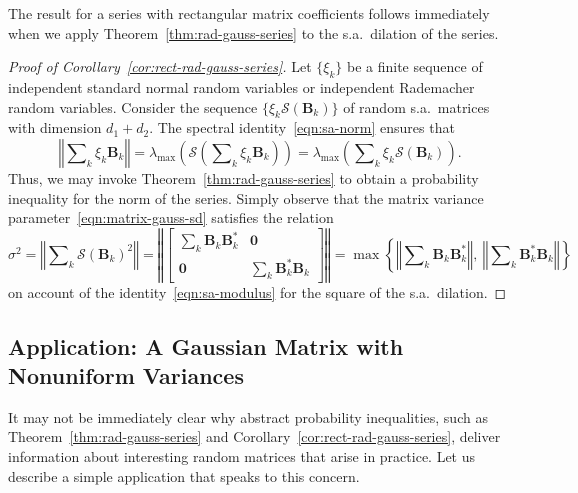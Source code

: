 \documentclass[11pt,letterpaper,twoside,reqno,draft]{amsart}
\theoremstyle{remark}
\numberwithin{equation}{section}
\numberwithin{thm}{section}
\begin{document}
The result for a series with rectangular matrix coefficients follows immediately when we apply Theorem~\ref{thm:rad-gauss-series} to the s.a.~dilation of the series.

\begin{proof}[Proof of Corollary~\ref{cor:rect-rad-gauss-series}]
Let $\{\xi_k\}$ be a finite sequence of independent standard normal random variables or independent Rademacher random variables.  Consider the sequence $\{ \xi_k {\mathscr{{S}}}( {\bm{{B}}}_k ) \}$ of random s.a.~matrices with dimension $d_1 + d_2$.
The spectral identity~\eqref{eqn:sa-norm} ensures that
$$
{\left\Vert {{ \sum\nolimits_k \xi_k {\bm{{B}}}_k }} \right\Vert}
	= \lambda_{\max}\left( {\mathscr{{S}}}\left( \sum\nolimits_k \xi_k {\bm{{B}}}_k \right) \right)
	= \lambda_{\max}\left(\sum\nolimits_k \xi_k {\mathscr{{S}}}({\bm{{B}}}_k)\right).
$$
Thus, we may invoke Theorem~\ref{thm:rad-gauss-series} to obtain a probability inequality for the norm of the series.
Simply observe that the matrix variance parameter~\eqref{eqn:matrix-gauss-sd} satisfies the relation
$$
\sigma^2 = {\left\Vert {{ \sum\nolimits_k {\mathscr{{S}}}({\bm{{B}}}_k)^2 }} \right\Vert}
	= {\left\Vert {{ \begin{bmatrix} \sum\nolimits_k {\bm{{B}}}_k {\bm{{B}}}_k^{*} & {\bm{{0}}} \\
	 {\bm{{0}}} & \sum\nolimits_k {\bm{{B}}}_k^{*}{\bm{{B}}}_k \end{bmatrix} }} \right\Vert}
	= \max\left\{
	{\left\Vert {{ \sum\nolimits_k {\bm{{B}}}_k {\bm{{B}}}_k^{*}}} \right\Vert}, \
	{\left\Vert {{ \sum\nolimits_k {\bm{{B}}}_k^{*} {\bm{{B}}}_k}} \right\Vert}
	\right\}
$$
on account of the identity~\eqref{eqn:sa-modulus} for the square of the s.a.~dilation.
\end{proof}

\subsection{Application: A Gaussian Matrix with Nonuniform Variances}

It may not be immediately clear why abstract probability inequalities, such as Theorem~\ref{thm:rad-gauss-series} and Corollary~\ref{cor:rect-rad-gauss-series}, deliver information about interesting random matrices that arise in practice.  
Let us describe a simple application that speaks to this concern.
\end{document}
